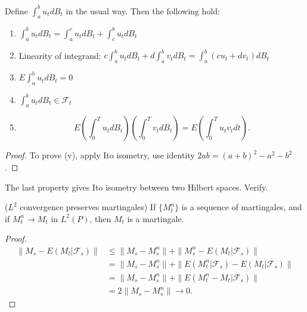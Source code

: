 Define $\int _a^b u_t dB_t$ in the usual way. Then the following hold:
\begin{proposition}
	\begin{enumerate}
		\item $\int _a^b u_t d B_t = \int _a^c u_t d B_t+ \int _c^bu_t d B_t$
		\item Linearity of integrand: $c \int _a^b u_t d B_t + d \int _a^b v_t d B_t = \int _a^b (cu_t + dv_t) d B_t$
		\item $E \int _a^b u_t d B_t = 0$
		\item $\int _a^b u_t d B_t \in \mathcal{F}_t$
		\item \[
			E\left( \int _0^T u_t dB_t \right) \left( \int _0^T v_t dB_t \right) 
			= E\left( \int _0^T u_t v_t dt \right) 
		.\] 
	\end{enumerate}
\end{proposition}
\begin{proof}
	To prove (v), apply Ito isometry, use identity  $2 ab = (a + b)^2 - a^2 - b^2$.
\end{proof}
The last property gives Ito isometry between two Hilbert spaces. \followup Verify.


\begin{lemma}
	($L^2$ convergence preserves martingales) If $\{M_t^n\} $ is a sequence of martingales, and if $M_t^n \to M_t$ in $L^2(P)$, then $M_t$ is a martingale.
\end{lemma}
\begin{proof}
	\begin{align*}
		\|M_s - E\left( M_t | \mathcal{F}_s \right) \|
		&\leq \|M_s - M_s^n\| + \|M_s^n - E\left( M_t | \mathcal{F}_s \right) \| \\
		&= \|M_s - M_s^n\| + \|E\left( M_t^n | \mathcal{F}_s \right)  - E\left( M_t | \mathcal{F}_s \right) \| \\
		&= \|M_s - M_s^n\| + \|E\left( M_t^n - M_t | \mathcal{F}_s \right) \| \\
		&= 2\|M_s - M_s^n\| \to 0
	.\end{align*}
\end{proof}

